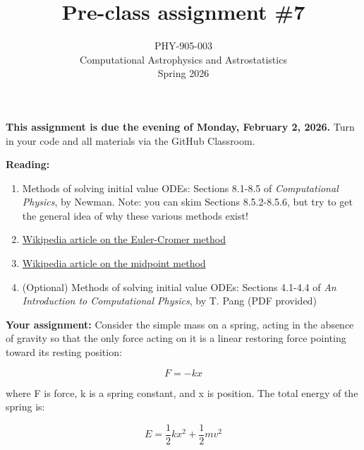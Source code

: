 \documentclass[10pt]{article}
\title{Pre-class assignment \#7}
\author{PHY-905-003\\Computational Astrophysics and
  Astrostatistics\\Spring 2026}
\date{} %
\begin{document}
 
\maketitle

\vspace{-5mm}

\noindent
\textbf{This assignment is due the evening of Monday, February 2, 2026.}
 Turn in your code
and all materials via the GitHub Classroom.

\vspace{5mm}

\noindent
\textbf{Reading:}

\begin{enumerate}

\item Methods of solving initial value ODEs: Sections 8.1-8.5 of
  \textit{Computational Physics}, by Newman.   Note: you can skim
  Sections 8.5.2-8.5.6, but try to get the general idea of why these
  various methods exist!

\item 
  \href{https://en.wikipedia.org/wiki/Semi-implicit_Euler_method}{Wikipedia article
    on the Euler-Cromer method}  

\item 
  \href{https://en.wikipedia.org/wiki/Midpoint_method}{Wikipedia article
    on the midpoint method} 

\item (Optional) Methods of solving initial value ODEs: Sections 4.1-4.4  of \textit{An Introduction to Computational Physics},
  by T. Pang (PDF provided)


\end{enumerate}


\noindent
\textbf{Your assignment:}
Consider the simple mass on a spring, acting in the absence of gravity
so that the only force acting on it is a linear restoring force
pointing toward its resting position:

\begin{equation}
F = -k x
\end{equation}

where F is force, k is a spring constant, and x is position.  The
total energy of the spring is:

\begin{equation}
E = \frac{1}{2} k x^2 + \frac{1}{2}  m v^2
\end{equation}
\end{document}
